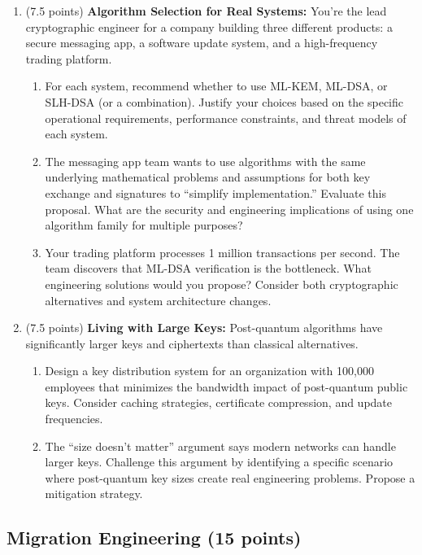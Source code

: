 \documentclass[10pt,a4paper,american]{article}
\begin{document}
\begin{enumerate}
	\item (7.5 points) \textbf{Algorithm Selection for Real Systems:}
	      You're the lead cryptographic engineer for a company building three different products: a secure messaging app, a software update system, and a high-frequency trading platform.
	      \begin{enumerate}
		      \item For each system, recommend whether to use ML-KEM, ML-DSA, or SLH-DSA (or a combination). Justify your choices based on the specific operational requirements, performance constraints, and threat models of each system.
		      \item The messaging app team wants to use algorithms with the same underlying mathematical problems and assumptions for both key exchange and signatures to ``simplify implementation.'' Evaluate this proposal. What are the security and engineering implications of using one algorithm family for multiple purposes?
		      \item Your trading platform processes 1 million transactions per second. The team discovers that ML-DSA verification is the bottleneck. What engineering solutions would you propose? Consider both cryptographic alternatives and system architecture changes.
	      \end{enumerate}
	\item (7.5 points) \textbf{Living with Large Keys:}
	      Post-quantum algorithms have significantly larger keys and ciphertexts than classical alternatives.
	      \begin{enumerate}
		      \item Design a key distribution system for an organization with 100,000 employees that minimizes the bandwidth impact of post-quantum public keys. Consider caching strategies, certificate compression, and update frequencies.
		      \item The ``size doesn't matter'' argument says modern networks can handle larger keys. Challenge this argument by identifying a specific scenario where post-quantum key sizes create real engineering problems. Propose a mitigation strategy.
	      \end{enumerate}
\end{enumerate}

\subsection{Migration Engineering (15 points)}
\end{document}
